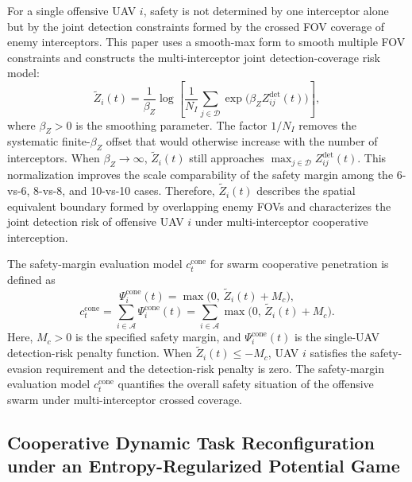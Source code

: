 \documentclass{cja}
\begin{document}
For a single offensive UAV $i$, safety is not determined by one interceptor alone but by the joint detection constraints formed by the crossed FOV coverage of enemy interceptors. This paper uses a smooth-max form to smooth multiple FOV constraints and constructs the multi-interceptor joint detection-coverage risk model:
\begin{equation}
\widetilde Z_i(t)
=
\frac{1}{\beta_Z}
\log\left[
\frac{1}{N_I}
\sum_{j\in\mathcal{D}}
\exp\!\bigl(\beta_Z Z_{ij}^{\mathrm{det}}(t)\bigr)
\right],
\end{equation}
where $\beta_Z>0$ is the smoothing parameter. The factor $1/N_I$ removes the systematic finite-$\beta_Z$ offset that would otherwise increase with the number of interceptors. When $\beta_Z\to\infty$, $\widetilde Z_i(t)$ still approaches $\max_{j\in\mathcal{D}} Z_{ij}^{\mathrm{det}}(t)$. This normalization improves the scale comparability of the safety margin among the 6-vs-6, 8-vs-8, and 10-vs-10 cases. Therefore, $\widetilde Z_i(t)$ describes the spatial equivalent boundary formed by overlapping enemy FOVs and characterizes the joint detection risk of offensive UAV $i$ under multi-interceptor cooperative interception.

The safety-margin evaluation model $c_t^{\mathrm{cone}}$ for swarm cooperative penetration is defined as
\begin{equation}
\Psi_i^{\mathrm{cone}}(t)
=
\max\bigl(0,\, \widetilde Z_i(t)+M_c\bigr),
\end{equation}
\begin{equation}
c_t^{\mathrm{cone}}
=
\sum_{i\in\mathcal{A}}
\Psi_i^{\mathrm{cone}}(t)
=
\sum_{i\in\mathcal{A}}
\max\bigl(0,\, \widetilde Z_i(t)+M_c\bigr).
\end{equation}
Here, $M_c>0$ is the specified safety margin, and $\Psi_i^{\mathrm{cone}}(t)$ is the single-UAV detection-risk penalty function. When $\widetilde Z_i(t)\le -M_c$, UAV $i$ satisfies the safety-evasion requirement and the detection-risk penalty is zero.
The safety-margin evaluation model $c_t^{\mathrm{cone}}$ quantifies the overall safety situation of the offensive swarm under multi-interceptor crossed coverage.

\subsection{Cooperative Dynamic Task Reconfiguration under an Entropy-Regularized Potential Game}
\end{document}
